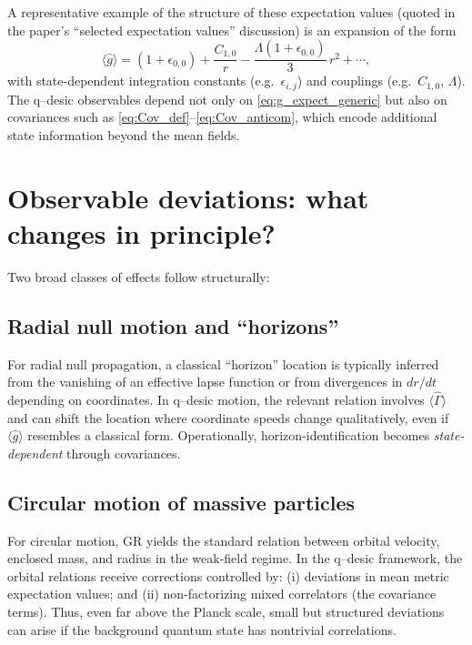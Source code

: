 \documentclass[11pt,a4paper]{article}
\theoremstyle{thmstyleone}
\theoremstyle{thmstyletwo}
\theoremstyle{thmstylethree}
\begin{document}
        A representative example of the structure of these expectation values (quoted in the paper's ``selected expectation values'' discussion)
        is an expansion of the form
        \begin{equation}
            \langle \hat g\rangle
            =
            (1+\epsilon_{0,0}) + \frac{C_{1,0}}{r} - \frac{\Lambda(1+\epsilon_{0,0})}{3}\,r^2 + \cdots,
            \label{eq:g_expect_generic}
        \end{equation}
        with state-dependent integration constants (e.g.\ $\epsilon_{i,j}$) and couplings (e.g.\ $C_{1,0}$, $\Lambda$).
        The q--desic observables depend not only on \eqref{eq:g_expect_generic} but also on covariances such as \eqref{eq:Cov_def}--\eqref{eq:Cov_anticom},
        which encode additional state information beyond the mean fields.

        \section{Observable deviations: what changes in principle?}
        Two broad classes of effects follow structurally:

        \subsection{Radial null motion and ``horizons''}
            For radial null propagation, a classical ``horizon'' location is typically inferred from the vanishing of an effective lapse function
            or from divergences in $dr/dt$ depending on coordinates. In q--desic motion, the relevant relation involves
            $\langle \hat\Gamma\rangle$ and can shift the location where coordinate speeds change qualitatively, even if
            $\langle \hat g\rangle$ resembles a classical form.
            Operationally, horizon-identification becomes \emph{state-dependent} through covariances.

        \subsection{Circular motion of massive particles}
            For circular motion, GR yields the standard relation between orbital velocity, enclosed mass, and radius
            in the weak-field regime. In the q--desic framework, the orbital relations receive corrections controlled by:
            (i) deviations in mean metric expectation values; and (ii) non-factorizing mixed correlators (the covariance terms).
            Thus, even far above the Planck scale, small but structured deviations can arise if the background quantum state
            has nontrivial correlations.
\end{document}
